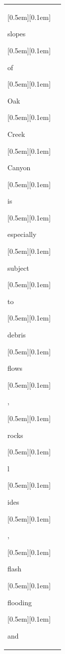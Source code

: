 \begin{table}[ht]
\begin{tabular}{@{}l p{13cm}@{}}
{\setlength{\fboxsep}{1pt}\raisebox{0pt}[0.5em][0.1em]{\colorbox{Salmon!60}{\strut{ slopes}}}}{\setlength{\fboxsep}{1pt}\raisebox{0pt}[0.5em][0.1em]{\colorbox{SkyBlue!55}{\strut{ of}}}}{\setlength{\fboxsep}{1pt}\raisebox{0pt}[0.5em][0.1em]{\colorbox{SkyBlue!55}{\strut{ Oak}}}}{\setlength{\fboxsep}{1pt}\raisebox{0pt}[0.5em][0.1em]{\colorbox{Salmon!60}{\strut{ Creek}}}}{\setlength{\fboxsep}{1pt}\raisebox{0pt}[0.5em][0.1em]{\colorbox{Salmon!60}{\strut{ Canyon}}}}{\setlength{\fboxsep}{1pt}\raisebox{0pt}[0.5em][0.1em]{\colorbox{Salmon!60}{\strut{ is}}}}{\setlength{\fboxsep}{1pt}\raisebox{0pt}[0.5em][0.1em]{\colorbox{Salmon!60}{\strut{ especially}}}}{\setlength{\fboxsep}{1pt}\raisebox{0pt}[0.5em][0.1em]{\colorbox{DarkOrchid!25}{\strut{ subject}}}}{\setlength{\fboxsep}{1pt}\raisebox{0pt}[0.5em][0.1em]{\colorbox{SkyBlue!55}{\strut{ to}}}}{\setlength{\fboxsep}{1pt}\raisebox{0pt}[0.5em][0.1em]{\colorbox{Salmon!60}{\strut{ debris}}}}{\setlength{\fboxsep}{1pt}\raisebox{0pt}[0.5em][0.1em]{\colorbox{Salmon!60}{\strut{ flows}}}}{\setlength{\fboxsep}{1pt}\raisebox{0pt}[0.5em][0.1em]{\colorbox{Salmon!60}{\strut{,}}}}{\setlength{\fboxsep}{1pt}\raisebox{0pt}[0.5em][0.1em]{\colorbox{Salmon!60}{\strut{ rocks}}}}{\setlength{\fboxsep}{1pt}\raisebox{0pt}[0.5em][0.1em]{\colorbox{DarkOrchid!25}{\strut{l}}}}{\setlength{\fboxsep}{1pt}\raisebox{0pt}[0.5em][0.1em]{\colorbox{DarkOrchid!25}{\strut{ides}}}}{\setlength{\fboxsep}{1pt}\raisebox{0pt}[0.5em][0.1em]{\colorbox{SkyBlue!55}{\strut{,}}}}{\setlength{\fboxsep}{1pt}\raisebox{0pt}[0.5em][0.1em]{\colorbox{Salmon!60}{\strut{ flash}}}}{\setlength{\fboxsep}{1pt}\raisebox{0pt}[0.5em][0.1em]{\colorbox{DarkOrchid!25}{\strut{ flooding}}}}{\setlength{\fboxsep}{1pt}\raisebox{0pt}[0.5em][0.1em]{\colorbox{SkyBlue!55}{\strut{ and}}}}


\end{tabular}
\end{table}
